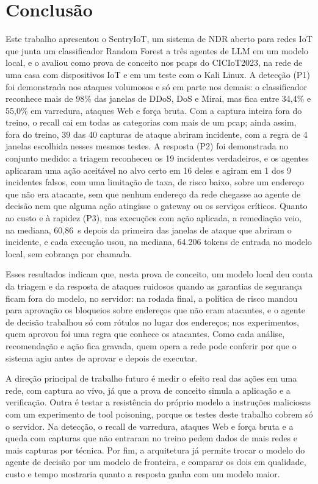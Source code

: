 \section{Conclusão}
\label{sec:conclusao}

Este trabalho apresentou o SentryIoT, um sistema de NDR aberto para redes IoT que junta um classificador Random Forest a três agentes de LLM em um modelo local, e o avaliou como prova de conceito nos pcaps do CICIoT2023, na rede de uma casa com dispositivos IoT e em um teste com o Kali Linux. A detecção (P1) foi demonstrada nos ataques volumosos e só em parte nos demais: o classificador reconhece mais de 98\% das janelas de DDoS, DoS e Mirai, mas fica entre 34,4\% e 55,0\% em varredura, ataques Web e força bruta. Com a captura inteira fora do treino, o recall cai em todas as categorias com mais de um pcap; ainda assim, fora do treino, 39 das 40 capturas de ataque abriram incidente, com a regra de 4 janelas escolhida nesses mesmos testes. A resposta (P2) foi demonstrada no conjunto medido: a triagem reconheceu os 19 incidentes verdadeiros, e os agentes aplicaram uma ação aceitável no alvo certo em 16 deles e agiram em 1 dos 9 incidentes falsos, com uma limitação de taxa, de risco baixo, sobre um endereço que não era atacante, sem que nenhum endereço da rede chegasse ao agente de decisão nem que alguma ação atingisse o gateway ou os serviços críticos. Quanto ao custo e à rapidez (P3), nas execuções com ação aplicada, a remediação veio, na mediana, 60,86~s depois da primeira das janelas de ataque que abriram o incidente, e cada execução usou, na mediana, 64.206 tokens de entrada no modelo local, sem cobrança por chamada.

Esses resultados indicam que, nesta prova de conceito, um modelo local deu conta da triagem e da resposta de ataques ruidosos quando as garantias de segurança ficam fora do modelo, no servidor: na rodada final, a política de risco mandou para aprovação os bloqueios sobre endereços que não eram atacantes, e o agente de decisão trabalhou só com rótulos no lugar dos endereços; nos experimentos, quem aprovou foi uma regra que conhece os atacantes. Como cada análise, recomendação e ação fica gravada, quem opera a rede pode conferir por que o sistema agiu antes de aprovar e depois de executar.

A direção principal de trabalho futuro é medir o efeito real das ações em uma rede, com captura ao vivo, já que a prova de conceito simula a aplicação e a verificação. Outra é testar a resistência do próprio modelo a instruções maliciosas com um experimento de tool poisoning, porque os testes deste trabalho cobrem só o servidor. Na detecção, o recall de varredura, ataques Web e força bruta e a queda com capturas que não entraram no treino pedem dados de mais redes e mais capturas por técnica. Por fim, a arquitetura já permite trocar o modelo do agente de decisão por um modelo de fronteira, e comparar os dois em qualidade, custo e tempo mostraria quanto a resposta ganha com um modelo maior.
